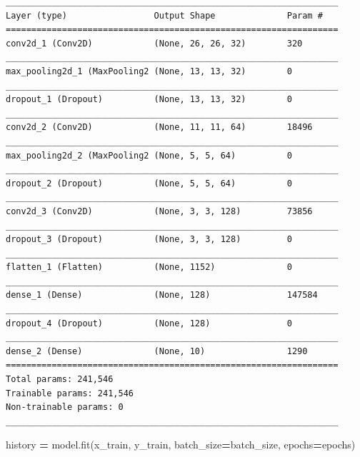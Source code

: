 \documentclass[]{book}
\newenvironment{Shaded}{\begin{snugshade}}{\end{snugshade}}
\newcommand{\OperatorTok}[1]{\textcolor[rgb]{0.81,0.36,0.00}{\textbf{#1}}}
\newcommand{\NormalTok}[1]{#1}
\theoremstyle{definition}
\theoremstyle{definition}
\theoremstyle{definition}
\theoremstyle{remark}
\begin{document}
\begin{verbatim}
_________________________________________________________________
Layer (type)                 Output Shape              Param #   
=================================================================
conv2d_1 (Conv2D)            (None, 26, 26, 32)        320       
_________________________________________________________________
max_pooling2d_1 (MaxPooling2 (None, 13, 13, 32)        0         
_________________________________________________________________
dropout_1 (Dropout)          (None, 13, 13, 32)        0         
_________________________________________________________________
conv2d_2 (Conv2D)            (None, 11, 11, 64)        18496     
_________________________________________________________________
max_pooling2d_2 (MaxPooling2 (None, 5, 5, 64)          0         
_________________________________________________________________
dropout_2 (Dropout)          (None, 5, 5, 64)          0         
_________________________________________________________________
conv2d_3 (Conv2D)            (None, 3, 3, 128)         73856     
_________________________________________________________________
dropout_3 (Dropout)          (None, 3, 3, 128)         0         
_________________________________________________________________
flatten_1 (Flatten)          (None, 1152)              0         
_________________________________________________________________
dense_1 (Dense)              (None, 128)               147584    
_________________________________________________________________
dropout_4 (Dropout)          (None, 128)               0         
_________________________________________________________________
dense_2 (Dense)              (None, 10)                1290      
=================================================================
Total params: 241,546
Trainable params: 241,546
Non-trainable params: 0
_________________________________________________________________
\end{verbatim}

\begin{Shaded}
\begin{Highlighting}[]
\NormalTok{history }\OperatorTok{=}\NormalTok{ model.fit(x_train, y_train,}
\NormalTok{          batch_size}\OperatorTok{=}\NormalTok{batch_size,}
\NormalTok{          epochs}\OperatorTok{=}\NormalTok{epochs)}
\end{Highlighting}
\end{Shaded}
\end{document}

